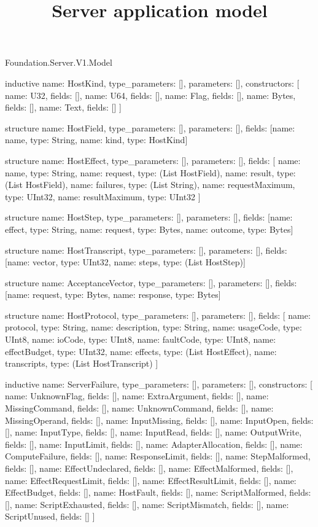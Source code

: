 \begin{lexlean}{Foundation.Server.V1.Model}
\title{Server application model}
\begin{semanticmodule}
inductive{
  name: HostKind,
  type_parameters: [],
  parameters: [],
  constructors: [
    {name: U32, fields: []},
    {name: U64, fields: []},
    {name: Flag, fields: []},
    {name: Bytes, fields: []},
    {name: Text, fields: []}
  ]
}

structure{
  name: HostField,
  type_parameters: [],
  parameters: [],
  fields: [{name: name, type: String}, {name: kind, type: HostKind}]
}

structure{
  name: HostEffect,
  type_parameters: [],
  parameters: [],
  fields: [
    {name: name, type: String},
    {name: request, type: (List HostField)},
    {name: result, type: (List HostField)},
    {name: failures, type: (List String)},
    {name: requestMaximum, type: UInt32},
    {name: resultMaximum, type: UInt32}
  ]
}

structure{
  name: HostStep,
  type_parameters: [],
  parameters: [],
  fields: [{name: effect, type: String}, {name: request, type: Bytes}, {name: outcome, type: Bytes}]
}

structure{
  name: HostTranscript,
  type_parameters: [],
  parameters: [],
  fields: [{name: vector, type: UInt32}, {name: steps, type: (List HostStep)}]
}

structure{
  name: AcceptanceVector,
  type_parameters: [],
  parameters: [],
  fields: [{name: request, type: Bytes}, {name: response, type: Bytes}]
}

structure{
  name: HostProtocol,
  type_parameters: [],
  parameters: [],
  fields: [
    {name: protocol, type: String},
    {name: description, type: String},
    {name: usageCode, type: UInt8},
    {name: ioCode, type: UInt8},
    {name: faultCode, type: UInt8},
    {name: effectBudget, type: UInt32},
    {name: effects, type: (List HostEffect)},
    {name: transcripts, type: (List HostTranscript)}
  ]
}

inductive{
  name: ServerFailure,
  type_parameters: [],
  parameters: [],
  constructors: [
    {name: UnknownFlag, fields: []},
    {name: ExtraArgument, fields: []},
    {name: MissingCommand, fields: []},
    {name: UnknownCommand, fields: []},
    {name: MissingOperand, fields: []},
    {name: InputMissing, fields: []},
    {name: InputOpen, fields: []},
    {name: InputType, fields: []},
    {name: InputRead, fields: []},
    {name: OutputWrite, fields: []},
    {name: InputLimit, fields: []},
    {name: AdapterAllocation, fields: []},
    {name: ComputeFailure, fields: []},
    {name: ResponseLimit, fields: []},
    {name: StepMalformed, fields: []},
    {name: EffectUndeclared, fields: []},
    {name: EffectMalformed, fields: []},
    {name: EffectRequestLimit, fields: []},
    {name: EffectResultLimit, fields: []},
    {name: EffectBudget, fields: []},
    {name: HostFault, fields: []},
    {name: ScriptMalformed, fields: []},
    {name: ScriptExhausted, fields: []},
    {name: ScriptMismatch, fields: []},
    {name: ScriptUnused, fields: []}
  ]
}


\end{semanticmodule}
\end{lexlean}

